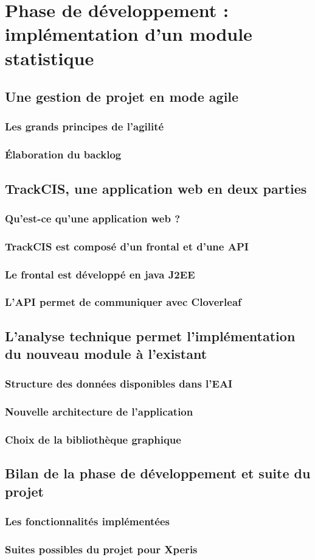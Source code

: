 \section{Phase de développement : implémentation d'un module statistique}

\subsection{Une gestion de projet en mode agile}
\subsubsection{Les grands principes de l'agilité}
\subsubsection{Élaboration du backlog}

\subsection{TrackCIS, une application web en deux parties}
\subsubsection{Qu'est-ce qu'une application web ?}
\subsubsection{TrackCIS est composé d'un frontal et d'une API}
\subsubsection{Le frontal est développé en java J2EE}
\subsubsection{L'API permet de communiquer avec Cloverleaf}

\subsection{L'analyse technique permet l'implémentation du nouveau module à l'existant}
\subsubsection{Structure des données disponibles dans l'EAI}
\subsubsection{Nouvelle architecture de l'application}
\subsubsection{Choix de la bibliothèque graphique}

\subsection{Bilan de la phase de développement et suite du projet}
\subsubsection{Les fonctionnalités implémentées}
\subsubsection{Suites possibles du projet pour Xperis}